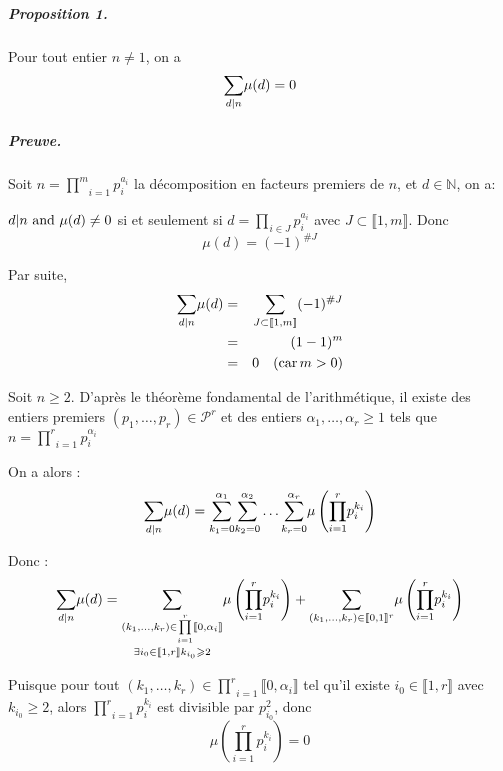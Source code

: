 \subparagraph{Proposition 1.}

Pour tout entier $n \neq 1$, on a
\[ \underset{d |  n}{\sum} \mu (d) = 0 \]

\subparagraph{Preuve.}

 Soit $n = \underset{i = 1}{\overset{m}{\prod}}
p^{a_i}_i$ la d{\'e}composition en facteurs premiers de $n$, et $d \in
\mathbb{N}$, on a:

$d |  n \text{ and } \mu (d) \neq 0$ si et seulement si $d =
\underset{i \in J}{\overset{}{\prod}} p^{a_i}_i$ avec $J \subset \llbracket 1,
m \rrbracket$. Donc
\[ \mu (d) = (- 1)^{\#J} \]


Par suite,
\begin{eqnarray*}
  \underset{d |  n}{\sum} \mu (d) & = & \underset{J \subset
  \llbracket 1, m \rrbracket}{\sum} (- 1)^{\#J}\\
  & = & (1 - 1)^m\\
  & = & 0 \quad (\operatorname{car} m > 0)
\end{eqnarray*}


 Soit $n \geqslant 2$. D'apr{\`e}s le
th{\'e}or{\`e}me fondamental de l'arithm{\'e}tique, il existe des entiers
premiers $(p_1, \ldots, p_r) \in \mathcal{P}^r$ et des entiers $\alpha_1,
\ldots, \alpha_r \geqslant 1$ tels que $n = \underset{i =
1}{\overset{r}{\prod}} p^{\alpha_i}_i$

On a alors :
\[ \underset{d |  n}{\sum} \mu (d) = \underset{k_1 =
   0}{\overset{\alpha_1}{\sum}} \underset{k_2 = 0}{\overset{\alpha_2}{\sum}}
   \ldots \underset{k_r = 0}{\overset{\alpha_r}{\sum}} \mu \left( \underset{i
   = 1}{\overset{r}{\prod}} p^{k_i}_i \right) \]


Donc :
\[ \underset{d |  n}{\sum} \mu (d) = \underset{\exists i_0 \in
   \llbracket 1, r \rrbracket k_{i_0} \geqslant 2}{\underset{(k_1, \ldots,
   k_r) \in \underset{i = 1}{\overset{r}{\prod}} \llbracket 0, \alpha_i
   \rrbracket}{\overset{}{\sum}}} \mu \left( \underset{i =
   1}{\overset{r}{\prod}} p^{k_i}_i \right) + \underset{}{\underset{(k_1,
   \ldots, k_r) \in \llbracket 0, 1 \rrbracket^r}{\overset{}{\sum}}} \mu
   \left( \underset{i = 1}{\overset{r}{\prod}} p^{k_i}_i \right) \]


Puisque pour tout $(k_1, \ldots, k_r) \in \underset{i = 1}{\overset{r}{\prod}}
\llbracket 0, \alpha_i \rrbracket$ tel qu'il existe $i_0 \in \llbracket 1, r
\rrbracket$ avec $k_{i_0} \geqslant 2$, alors $\underset{i =
1}{\overset{r}{\prod}} p^{k_i}_i$ est divisible par $p^2_{i_0 }$, donc
\[ \mu \left( \underset{i = 1}{\overset{r}{\prod}} p^{k_i}_i \right) = 0 \]


